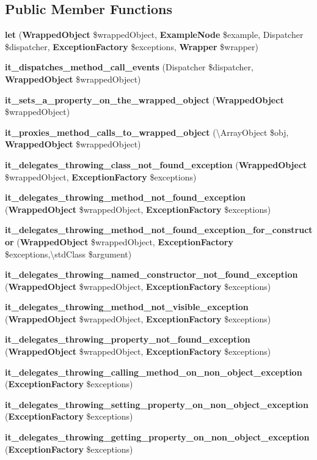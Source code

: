 \subsection*{Public Member Functions}
\begin{DoxyCompactItemize}
\item 
{\bf let} ({\bf Wrapped\+Object} \$wrapped\+Object, {\bf Example\+Node} \$example, Dispatcher \$dispatcher, {\bf Exception\+Factory} \$exceptions, {\bf Wrapper} \$wrapper)
\item 
{\bf it\+\_\+dispatches\+\_\+method\+\_\+call\+\_\+events} (Dispatcher \$dispatcher, {\bf Wrapped\+Object} \$wrapped\+Object)
\item 
{\bf it\+\_\+sets\+\_\+a\+\_\+property\+\_\+on\+\_\+the\+\_\+wrapped\+\_\+object} ({\bf Wrapped\+Object} \$wrapped\+Object)
\item 
{\bf it\+\_\+proxies\+\_\+method\+\_\+calls\+\_\+to\+\_\+wrapped\+\_\+object} (\textbackslash{}Array\+Object \$obj, {\bf Wrapped\+Object} \$wrapped\+Object)
\item 
{\bf it\+\_\+delegates\+\_\+throwing\+\_\+class\+\_\+not\+\_\+found\+\_\+exception} ({\bf Wrapped\+Object} \$wrapped\+Object, {\bf Exception\+Factory} \$exceptions)
\item 
{\bf it\+\_\+delegates\+\_\+throwing\+\_\+method\+\_\+not\+\_\+found\+\_\+exception} ({\bf Wrapped\+Object} \$wrapped\+Object, {\bf Exception\+Factory} \$exceptions)
\item 
{\bf it\+\_\+delegates\+\_\+throwing\+\_\+method\+\_\+not\+\_\+found\+\_\+exception\+\_\+for\+\_\+constructor} ({\bf Wrapped\+Object} \$wrapped\+Object, {\bf Exception\+Factory} \$exceptions,\textbackslash{}std\+Class \$argument)
\item 
{\bf it\+\_\+delegates\+\_\+throwing\+\_\+named\+\_\+constructor\+\_\+not\+\_\+found\+\_\+exception} ({\bf Wrapped\+Object} \$wrapped\+Object, {\bf Exception\+Factory} \$exceptions)
\item 
{\bf it\+\_\+delegates\+\_\+throwing\+\_\+method\+\_\+not\+\_\+visible\+\_\+exception} ({\bf Wrapped\+Object} \$wrapped\+Object, {\bf Exception\+Factory} \$exceptions)
\item 
{\bf it\+\_\+delegates\+\_\+throwing\+\_\+property\+\_\+not\+\_\+found\+\_\+exception} ({\bf Wrapped\+Object} \$wrapped\+Object, {\bf Exception\+Factory} \$exceptions)
\item 
{\bf it\+\_\+delegates\+\_\+throwing\+\_\+calling\+\_\+method\+\_\+on\+\_\+non\+\_\+object\+\_\+exception} ({\bf Exception\+Factory} \$exceptions)
\item 
{\bf it\+\_\+delegates\+\_\+throwing\+\_\+setting\+\_\+property\+\_\+on\+\_\+non\+\_\+object\+\_\+exception} ({\bf Exception\+Factory} \$exceptions)
\item 
{\bf it\+\_\+delegates\+\_\+throwing\+\_\+getting\+\_\+property\+\_\+on\+\_\+non\+\_\+object\+\_\+exception} ({\bf Exception\+Factory} \$exceptions)
\end{DoxyCompactItemize}
